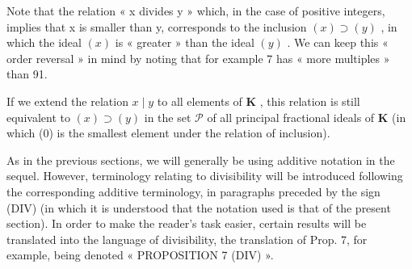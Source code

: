 Note that the relation « x divides y » which, in the case of positive integers, implies that x is smaller than y, corresponds to the inclusion \((x) \supset (y)\) , in which the ideal \((x)\) is « greater » than the ideal \((y)\) . We can keep this « order reversal » in mind by noting that for example 7 has « more multiples » than 91.

If we extend the relation \(x \mid y\) to all elements of \(\mathbf{K}\) , this relation is still equivalent to \((x) \supset (y)\) in the set \(\mathcal{P}\) of all principal fractional ideals of \(\mathbf{K}\) (in which (0) is the smallest element under the relation of inclusion).

As in the previous sections, we will generally be using additive notation in the sequel. However, terminology relating to divisibility will be introduced following the corresponding additive terminology, in paragraphs preceded by the sign (DIV) (in which it is understood that the notation used is that of the present section). In order to make the reader's task easier, certain results will be translated into the language of divisibility, the translation of Prop. 7, for example, being denoted « PROPOSITION 7 (DIV) ».

